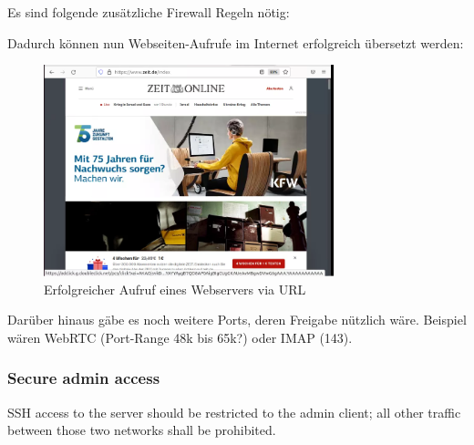 \documentclass{article}
\begin{document}
Es sind folgende zusätzliche Firewall Regeln nötig:

\begin{center}
\end{center}

Dadurch können nun Webseiten-Aufrufe im Internet erfolgreich übersetzt werden: 

\begin{figure}[H]
	\includegraphics[width=0.75\textwidth]{images/08}
	\centering
	\caption{Erfolgreicher Aufruf eines Webservers via URL}
\end{figure}

Darüber hinaus gäbe es noch weitere Ports, deren Freigabe nützlich wäre. Beispiel 
wären WebRTC (Port-Range 48k bis 65k?) oder IMAP (143).  

\subsubsection{Secure admin access}

SSH access to the server should be restricted to the admin client; all other traffic 
between those two networks shall be prohibited. 
\end{document}
